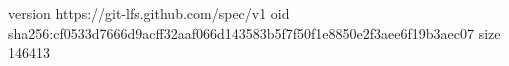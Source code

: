 version https://git-lfs.github.com/spec/v1
oid sha256:cf0533d7666d9acff32aaf066d143583b5f7f50f1e8850e2f3aee6f19b3aec07
size 146413
